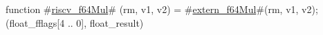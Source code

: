 function #\hyperref[sailRISCVzriscvzyf64Mul]{riscv\_f64Mul}# (rm, v1, v2) = {
  #\hyperref[sailRISCVzexternzyf64Mul]{extern\_f64Mul}#(rm, v1, v2);
  (float_fflags[4 .. 0], float_result)
}
